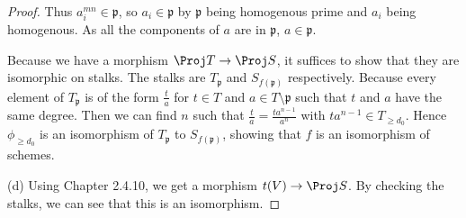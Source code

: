 \begin{proof}
	Thus $a_i^{mn} \in \mathfrak{p} $, so $a_i \in \mathfrak{p}$ by $\mathfrak{p} $ being homogenous prime and $a_i $ being homogenous.
	As all the components of $a $ are in $\mathfrak{p} $, $a\in \mathfrak{p} $.

	Because we have a morphism $\Proj T\to \Proj S $, it suffices to show that they are isomorphic on stalks.
	The stalks are $T_{\mathfrak{p}} $ and $S_{f(\mathfrak{p})} $ respectively.
	Because every element of $T_{\mathfrak{p}} $ is of the form $\frac{t}{a} $ for $t \in T $ and $a \in T\setminus \mathfrak{p}$ such that $t $ and $a $ have the same degree.
	Then we can find $n $ such that $\frac{t}{a} = \frac{ta^{n-1}}{a^n} $ with $ta^{n-1} \in T_{\ge d_{0}}  $.
	Hence $\phi_{\ge d_{0}}$ is an isomorphism of $T_{\mathfrak{p}} $ to $S_{f(\mathfrak{p})} $, showing that $f $ is an isomorphism of schemes.

	(d) Using Chapter 2.4.10, we get a morphism $t(V) \to \Proj S $.
	By checking the stalks, we can see that this is an isomorphism.
\end{proof}

